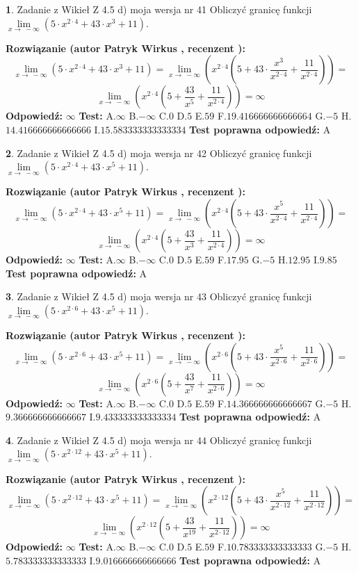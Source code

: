 \documentclass[12pt, a4paper]{article}
\theoremstyle{definition} %
\newtheorem{zad}{}
\newcommand{\zadStart}[1]{\begin{zad}#1\newline}
\newcommand{\zadStop}{\end{zad}}
\newcommand{\rozwStart}[2]{\noindent \textbf{Rozwiązanie (autor #1 , recenzent #2): }\newline}
\newcommand{\rozwStop}{\newline}
\newcommand{\odpStart}{\noindent \textbf{Odpowiedź:}\newline}
\newcommand{\odpStop}{\newline}
\newcommand{\testStart}{\noindent \textbf{Test:}\newline}
\newcommand{\testStop}{\newline}
\newcommand{\kluczStart}{\noindent \textbf{Test poprawna odpowiedź:}\newline}
\newcommand{\kluczStop}{\newline}
\begin{document}
\zadStart{Zadanie z Wikieł Z 4.5 d) moja wersja nr 41}
Obliczyć granicę funkcji  $\lim\limits_{x\to\ -\infty}(5 \cdot x^{2\cdot4}+43 \cdot x^{3}+11)$.
\zadStop
\rozwStart{Patryk Wirkus}{}
$$\lim\limits_{x\to\ -\infty}(5 \cdot x^{2\cdot4}+43 \cdot x^{3}+11) = \lim\limits_{x\to\ -\infty}(x^{2\cdot4}(5 +43 \cdot \frac{x^{3}}{x^{2\cdot4}}+\frac{11}{x^{2\cdot4}})) =$$ $$\lim\limits_{x\to\ -\infty}(x^{2\cdot4}(5 +\frac{43}{x^{5}}+\frac{11}{x^{2\cdot4}})) =\infty$$
\rozwStop
\odpStart
$\infty$
\odpStop
\testStart
A.$\infty$ B.$-\infty$ C.$0$ D.$5$ E.$59$
F.$19.416666666666664$ G.$-5$
H.$14.416666666666666$
I.$15.583333333333334$
\testStop
\kluczStart
A
\kluczStop



\zadStart{Zadanie z Wikieł Z 4.5 d) moja wersja nr 42}
Obliczyć granicę funkcji  $\lim\limits_{x\to\ -\infty}(5 \cdot x^{2\cdot4}+43 \cdot x^{5}+11)$.
\zadStop
\rozwStart{Patryk Wirkus}{}
$$\lim\limits_{x\to\ -\infty}(5 \cdot x^{2\cdot4}+43 \cdot x^{5}+11) = \lim\limits_{x\to\ -\infty}(x^{2\cdot4}(5 +43 \cdot \frac{x^{5}}{x^{2\cdot4}}+\frac{11}{x^{2\cdot4}})) =$$ $$\lim\limits_{x\to\ -\infty}(x^{2\cdot4}(5 +\frac{43}{x^{3}}+\frac{11}{x^{2\cdot4}})) =\infty$$
\rozwStop
\odpStart
$\infty$
\odpStop
\testStart
A.$\infty$ B.$-\infty$ C.$0$ D.$5$ E.$59$
F.$17.95$ G.$-5$
H.$12.95$
I.$9.85$
\testStop
\kluczStart
A
\kluczStop



\zadStart{Zadanie z Wikieł Z 4.5 d) moja wersja nr 43}
Obliczyć granicę funkcji  $\lim\limits_{x\to\ -\infty}(5 \cdot x^{2\cdot6}+43 \cdot x^{5}+11)$.
\zadStop
\rozwStart{Patryk Wirkus}{}
$$\lim\limits_{x\to\ -\infty}(5 \cdot x^{2\cdot6}+43 \cdot x^{5}+11) = \lim\limits_{x\to\ -\infty}(x^{2\cdot6}(5 +43 \cdot \frac{x^{5}}{x^{2\cdot6}}+\frac{11}{x^{2\cdot6}})) =$$ $$\lim\limits_{x\to\ -\infty}(x^{2\cdot6}(5 +\frac{43}{x^{7}}+\frac{11}{x^{2\cdot6}})) =\infty$$
\rozwStop
\odpStart
$\infty$
\odpStop
\testStart
A.$\infty$ B.$-\infty$ C.$0$ D.$5$ E.$59$
F.$14.366666666666667$ G.$-5$
H.$9.366666666666667$
I.$9.433333333333334$
\testStop
\kluczStart
A
\kluczStop



\zadStart{Zadanie z Wikieł Z 4.5 d) moja wersja nr 44}
Obliczyć granicę funkcji  $\lim\limits_{x\to\ -\infty}(5 \cdot x^{2\cdot12}+43 \cdot x^{5}+11)$.
\zadStop
\rozwStart{Patryk Wirkus}{}
$$\lim\limits_{x\to\ -\infty}(5 \cdot x^{2\cdot12}+43 \cdot x^{5}+11) = \lim\limits_{x\to\ -\infty}(x^{2\cdot12}(5 +43 \cdot \frac{x^{5}}{x^{2\cdot12}}+\frac{11}{x^{2\cdot12}})) =$$ $$\lim\limits_{x\to\ -\infty}(x^{2\cdot12}(5 +\frac{43}{x^{19}}+\frac{11}{x^{2\cdot12}})) =\infty$$
\rozwStop
\odpStart
$\infty$
\odpStop
\testStart
A.$\infty$ B.$-\infty$ C.$0$ D.$5$ E.$59$
F.$10.783333333333333$ G.$-5$
H.$5.783333333333333$
I.$9.016666666666666$
\testStop
\kluczStart
A
\kluczStop
\end{document}
